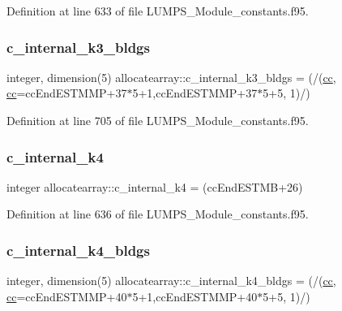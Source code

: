 Definition at line 633 of file L\+U\+M\+P\+S\+\_\+\+Module\+\_\+constants.\+f95.

\mbox{\label{namespaceallocatearray_a1eb952a71026325d2a811a547008ca14}} 
\subsubsection{\texorpdfstring{c\+\_\+internal\+\_\+k3\+\_\+bldgs}{c\_internal\_k3\_bldgs}}
{\footnotesize\ttfamily integer, dimension(5) allocatearray\+::c\+\_\+internal\+\_\+k3\+\_\+bldgs = (/(\hyperlink{namespaceallocatearray_ac863c81704eb507dee10f5e10741e10c}{cc}, \hyperlink{namespaceallocatearray_ac863c81704eb507dee10f5e10741e10c}{cc}=cc\+End\+E\+S\+T\+M\+MP+37$\ast$5+1,cc\+End\+E\+S\+T\+M\+MP+37$\ast$5+5, 1)/)}



Definition at line 705 of file L\+U\+M\+P\+S\+\_\+\+Module\+\_\+constants.\+f95.

\mbox{\label{namespaceallocatearray_a3c230d3db37cc9e9049260266500c799}} 
\subsubsection{\texorpdfstring{c\+\_\+internal\+\_\+k4}{c\_internal\_k4}}
{\footnotesize\ttfamily integer allocatearray\+::c\+\_\+internal\+\_\+k4 = (cc\+End\+E\+S\+T\+MB+26)}



Definition at line 636 of file L\+U\+M\+P\+S\+\_\+\+Module\+\_\+constants.\+f95.

\mbox{\label{namespaceallocatearray_ab282d65ad07ad23a979bed1bb5e4e688}} 
\subsubsection{\texorpdfstring{c\+\_\+internal\+\_\+k4\+\_\+bldgs}{c\_internal\_k4\_bldgs}}
{\footnotesize\ttfamily integer, dimension(5) allocatearray\+::c\+\_\+internal\+\_\+k4\+\_\+bldgs = (/(\hyperlink{namespaceallocatearray_ac863c81704eb507dee10f5e10741e10c}{cc}, \hyperlink{namespaceallocatearray_ac863c81704eb507dee10f5e10741e10c}{cc}=cc\+End\+E\+S\+T\+M\+MP+40$\ast$5+1,cc\+End\+E\+S\+T\+M\+MP+40$\ast$5+5, 1)/)}



